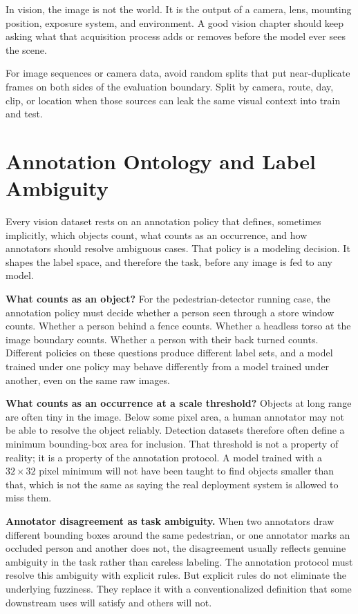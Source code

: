 \begin{practicalnote}
In vision, the image is not the world. It is the output of a camera, lens, mounting position, exposure system, and environment. A good vision chapter should keep asking what that acquisition process adds or removes before the model ever sees the scene.
\end{practicalnote}

\begin{warningbox}
For image sequences or camera data, avoid random splits that put near-duplicate frames on both sides of the evaluation boundary. Split by camera, route, day, clip, or location when those sources can leak the same visual context into train and test.
\end{warningbox}

\section{Annotation Ontology and Label Ambiguity}

Every vision dataset rests on an annotation policy that defines, sometimes implicitly, which objects count, what counts as an occurrence, and how annotators should resolve ambiguous cases. That policy is a modeling decision. It shapes the label space, and therefore the task, before any image is fed to any model.

\textbf{What counts as an object?} For the pedestrian-detector running case, the annotation policy must decide whether a person seen through a store window counts. Whether a person behind a fence counts. Whether a headless torso at the image boundary counts. Whether a person with their back turned counts. Different policies on these questions produce different label sets, and a model trained under one policy may behave differently from a model trained under another, even on the same raw images.

\textbf{What counts as an occurrence at a scale threshold?} Objects at long range are often tiny in the image. Below some pixel area, a human annotator may not be able to resolve the object reliably. Detection datasets therefore often define a minimum bounding-box area for inclusion. That threshold is not a property of reality; it is a property of the annotation protocol. A model trained with a $32 \times 32$ pixel minimum will not have been taught to find objects smaller than that, which is not the same as saying the real deployment system is allowed to miss them.

\textbf{Annotator disagreement as task ambiguity.} When two annotators draw different bounding boxes around the same pedestrian, or one annotator marks an occluded person and another does not, the disagreement usually reflects genuine ambiguity in the task rather than careless labeling. The annotation protocol must resolve this ambiguity with explicit rules. But explicit rules do not eliminate the underlying fuzziness. They replace it with a conventionalized definition that some downstream uses will satisfy and others will not.

